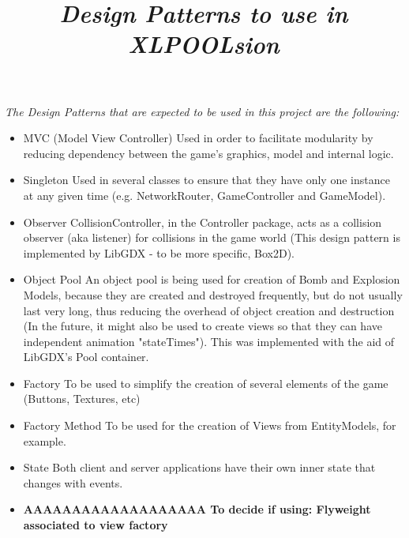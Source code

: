 \documentclass[12pt,a4paper]{article}
\title{\emph{{\Huge Design Patterns to use in XLPOOLsion}}}
\date{}
\author{}
\begin{document}
\maketitle

\emph{\large The Design Patterns that are expected to be used in this project are the following:}

\begin{itemize}
\item MVC (Model View Controller)
	\subitem Used in order to facilitate modularity by reducing dependency between the game's graphics, model and internal logic.
\item Singleton
	\subitem Used in several classes to ensure that they have only one instance at any given time (e.g. NetworkRouter, GameController and GameModel).
\item Observer
	\subitem CollisionController, in the Controller package, acts as a collision observer (aka listener) for collisions in the game world (This design pattern is implemented by LibGDX - to be more specific, Box2D).
\item Object Pool
	\subitem An object pool is being used for creation of Bomb and Explosion Models, because they are created and destroyed frequently, but do not usually last very long, thus reducing the overhead of object creation and destruction (In the future, it might also be used to create views so that they can have independent animation "stateTimes"). This was implemented with the aid of LibGDX's Pool container.
\item Factory
	\subitem To be used to simplify the creation of several elements of the game (Buttons, Textures, etc)
\item Factory Method
	\subitem To be used for the creation of Views from EntityModels, for example.
\item State
	\subitem Both client and server applications have their own inner state that changes with events.
\item \textbf{\Huge AAAAAAAAAAAAAAAAAAA To decide if using: Flyweight associated to view factory}
\end{itemize}
\end{document}
